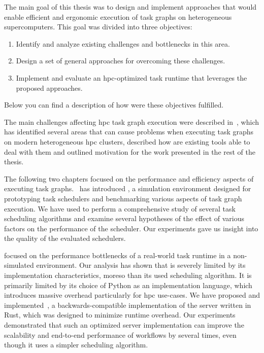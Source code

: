 The main goal of this thesis was to design and implement approaches that would enable efficient
and ergonomic execution of task graphs on heterogeneous supercomputers. This goal was divided
into three objectives:

\begin{enumerate}
	\item Identify and analyze existing challenges and bottlenecks in this area.
	\item Design a set of general approaches for overcoming these challenges.
	\item Implement and evaluate an \gls{hpc}-optimized task runtime that leverages the proposed
	approaches.
\end{enumerate}

Below you can find a description of how were these objectives fulfilled.

The main challenges affecting \gls{hpc} task graph execution were described in~, which
has identified several areas that can cause problems when executing task graphs on modern
heterogeneous \gls{hpc} clusters, described how are existing tools able to deal with them and
outlined motivation for the work presented in the rest of the thesis.

The following two chapters focused on the performance and efficiency aspects of executing task
graphs.~ has introduced \estee{}, a simulation
environment designed for prototyping task schedulers and benchmarking various aspects of task graph
execution. We have used \estee{} to perform a comprehensive study of several task
scheduling algorithms and examine several hypotheses of the effect of various factors on the
performance of the scheduler. Our experiments gave us insight into the quality of the evaluated
schedulers.

 focused on the performance bottlenecks of a real-world task runtime
\dask{} in a non-simulated environment. Our analysis
has shown that \dask{} is severely limited by its implementation
characteristics, moreso than its used scheduling algorithm. It is primarily limited by its choice
of Python as an implementation language, which introduces massive overhead particularly for
\gls{hpc} use-cases. We have proposed and implemented~\rsds{},
a backwards-compatible implementation of the \dask{} server written in Rust,
which was designed to minimize runtime overhead. Our experiments demonstrated that such an
optimized server implementation can improve the scalability and end-to-end performance of
\dask{} workflows by several times, even though it uses a simpler scheduling
algorithm.


